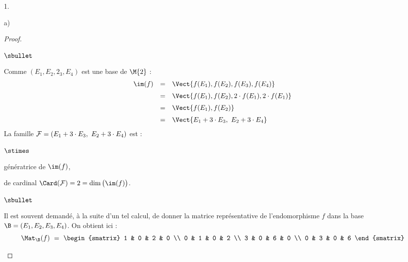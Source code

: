 \begin{noliste}{1.}
\begin{noliste}{a)}
\begin{proof}
\begin{noliste}{$\sbullet$}
      \item Comme $(E_1, E_2, 2_3, E_4)$ est une base de $\M{2}$ :
        \[
        \begin{array}{rcl}
          \im(f) & = & \Vect{f(E_1), f(E_2), f(E_3), f(E_4)}
          \\[.2cm]
          & = & \Vect{f(E_1), f(E_2), 2 \cdot f(E_1), 2 \cdot f(E_1)}
          \\[.2cm]
          & = & \Vect{f(E_1), f(E_2)}
          \\[.2cm]
          & = & \Vect{E_1 + 3 \cdot E_3, \ E_2 + 3 \cdot E_4}
        \end{array}
        \]
        La famille ${\cal F} = (E_1 + 3 \cdot E_3, \ E_2 + 3 \cdot
        E_4)$ est :
        \begin{noliste}{$\stimes$}
        \item génératrice de $\im(f)$,
        \item de cardinal $\Card({\cal F}) = 2 = \dim\big( \im(f)
          \big)$.
        \end{noliste}
      \end{noliste}
      \begin{remark}%
        \begin{noliste}{$\sbullet$}
        \item Il est souvent demandé, à la suite d'un tel calcul, de
          donner la matrice représentative de l'endomorphisme $f$ dans
          la base $\B = (E_1, E_2, E_3, E_4)$. On obtient ici :
          \[
          \Mat_{\B}(f) \ = \
          \begin{smatrix}
            1 & 0 & 2 & 0 \\
            0 & 1 & 0 & 2 \\
            3 & 0 & 6 & 0 \\
            0 & 3 & 0 & 6
          \end{smatrix}
          \]


\end{noliste}
\end{remark}
\end{proof}
\end{noliste}
\end{noliste}
